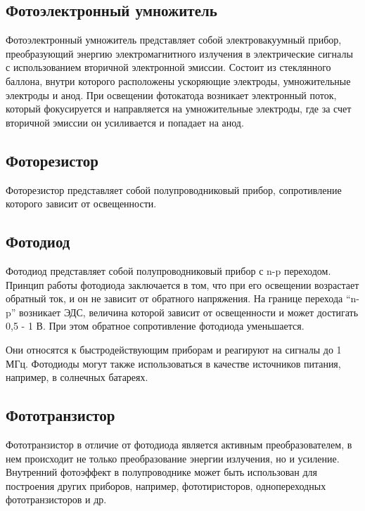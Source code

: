 \documentclass[unicode, 12pt, a4paper, oneside]{article}
\begin{document}
\subsection*{Фотоэлектронный умножитель}

Фотоэлектронный умножитель представляет собой электровакуумный прибор, преобразующий энергию электромагнитного излучения в электрические сигналы с использованием вторичной электронной эмиссии. Состоит из стеклянного баллона, внутри которого расположены ускоряющие электроды, умножительные электроды и анод. При освещении фотокатода возникает электронный поток, который фокусируется и направляется на умножительные электроды, где за счет вторичной эмиссии он усиливается и попадает на анод.

\subsection*{Фоторезистор}

Фоторезистор представляет собой полупроводниковый прибор, сопротивление которого зависит от освещенности.

\subsection*{Фотодиод}

Фотодиод представляет собой полупроводниковый прибор с n-p переходом. Принцип работы фотодиода заключается в том, что при его освещении возрастает обратный ток, и он не зависит от обратного напряжения. На границе перехода “n-p” возникает ЭДС, величина которой зависит от освещенности и может достигать 0,5 - 1 В. При этом обратное сопротивление фотодиода уменьшается.

Они относятся к быстродействующим приборам и реагируют на сигналы до 1 МГц. Фотодиоды могут также использоваться в качестве источников питания, например, в солнечных батареях.

\subsection*{Фототранзистор}

Фототранзистор в отличие от фотодиода является активным преобразователем, в нем происходит не только преобразование энергии излучения, но и усиление.
Внутренний фотоэффект в полупроводнике может быть использован для построения других приборов, например, фототиристоров, однопереходных фототранзисторов и др.


\end{document}
